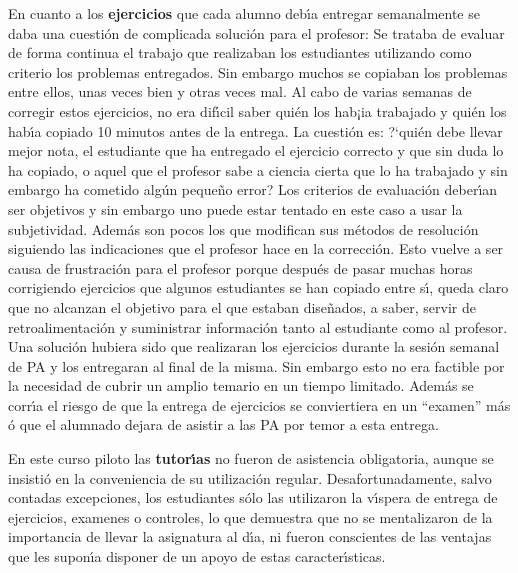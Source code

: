 En cuanto a los {\bf  ejercicios}
 que cada alumno deb\'{\i}a entregar semanalmente se daba una cuesti\'{o}n
de complicada soluci\'{o}n para el profesor:
Se trataba de evaluar de forma continua el trabajo que realizaban los estudiantes
utilizando como criterio los problemas entregados.
Sin embargo muchos  se copiaban los problemas entre ellos, 
unas veces bien y otras veces mal. Al cabo de  varias semanas
de corregir estos ejercicios, no era dif\'{\i}cil saber qui\'{e}n
 los hab¡ia trabajado
y qui\'{e}n los hab\'{\i}a copiado 10 minutos antes de la entrega.
La cuesti\'{o}n es: ?`qui\'{e}n debe llevar mejor nota,
 el estudiante que ha entregado 
el ejercicio correcto y que sin  duda lo ha copiado, o 
aquel que el profesor sabe a ciencia cierta que lo ha trabajado y sin embargo
ha cometido alg\'{u}n peque\~{n}o error?
Los criterios de evaluaci\'{o}n deber\'{\i}an ser objetivos y sin 
embargo uno puede estar tentado en este caso  a usar la subjetividad.
Adem\'{a}s son pocos los que modifican sus m\'{e}todos de resoluci\'{o}n
siguiendo las indicaciones que el profesor hace en la correcci\'{o}n.
Esto vuelve a ser causa de frustraci\'{o}n para el profesor
 porque despu\'{e}s de pasar muchas horas corrigiendo ejercicios 
que algunos  estudiantes
se han copiado entre s\'{\i}, queda claro que no alcanzan el objetivo
para el que estaban dise\~{n}ados, a saber, servir de retroalimentaci\'{o}n 
y suministrar informaci\'{o}n tanto al estudiante  como al profesor.
Una soluci\'{o}n  hubiera sido que  realizaran
 los ejercicios  durante la sesi\'{o}n semanal de PA y los entregaran 
al final de la misma.
 Sin embargo esto no 
era factible por la necesidad de cubrir un amplio temario 
en un tiempo limitado. Adem\'{a}s se corr\'{\i}a el riesgo
de que la entrega de ejercicios se conviertiera en un ``examen'' m\'{a}s \'{o}
que el alumnado dejara de asistir a las PA por temor a esta entrega.

En este curso piloto las {\bf tutor\'{\i}as} no fueron 
 de asistencia obligatoria, 
aunque se insisti\'{o} en la conveniencia de su utilizaci\'{o}n regular.
Desafortunadamente, salvo contadas excepciones, los estudiantes
s\'{o}lo las utilizaron la v\'{\i}spera de entrega de ejercicios, 
 examenes o controles, lo que demuestra que 
 no se  mentalizaron de la importancia de llevar 
la asignatura al d\'{\i}a, ni fueron  conscientes
de las ventajas que les supon\'{\i}a disponer de
un apoyo de estas caracter\'{\i}sticas.


